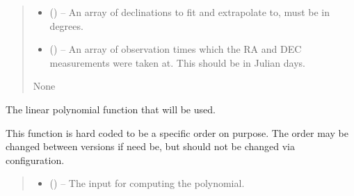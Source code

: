 \documentclass[letterpaper,11pt,english]{sphinxmanual}
\begin{document}
\begin{savenotes}
\begin{fulllineitems}
\begin{savenotes}
\begin{fulllineitems}
\begin{quote}
\begin{description}
\begin{itemize}
\item {} 
\sphinxAtStartPar
{} () – An array of declinations to fit and extrapolate to, must be in
degrees.

\item {} 
\sphinxAtStartPar
{} () – An array of observation times which the RA and DEC measurements
were taken at. This should be in Julian days.

\end{itemize}

\sphinxAtStartPar
None

\end{description}\end{quote}

\end{fulllineitems}\end{savenotes}


\begin{savenotes}\begin{fulllineitems}
\label{\detokenize{code/opihiexarata.propagate.polynomial:opihiexarata.propagate.polynomial.LinearPropagationEngine.__linear_function}}
\pysigstartsignatures
{}
\pysigstopsignatures
\sphinxAtStartPar
The linear polynomial function that will be used.

\sphinxAtStartPar
This function is hard coded to be a specific order on purpose. The
order may be changed between versions if need be, but should not be
changed via configuration.
\begin{quote}\begin{description}
\begin{itemize}
\item {} 
\sphinxAtStartPar
{} () – The input for computing the polynomial.


\end{itemize}
\end{description}
\end{quote}
\end{fulllineitems}
\end{savenotes}
\end{fulllineitems}
\end{savenotes}
\end{document}
